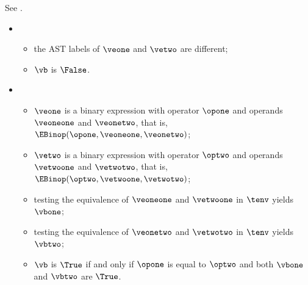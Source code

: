 
See .

\ProseParagraph
\OneApplies
\begin{itemize}
  \item {}
  \begin{itemize}
    \item the AST labels of $\veone$ and $\vetwo$ are different;
    \item $\vb$ is $\False$.
  \end{itemize}

  \item {}
  \begin{itemize}
    \item $\veone$ is a binary expression with operator $\opone$ and operands $\veoneone$ and $\veonetwo$,
          that is, $\EBinop(\opone, \veoneone, \veonetwo)$;
    \item $\vetwo$ is a binary expression with operator $\optwo$ and operands $\vetwoone$ and $\vetwotwo$,
          that is, $\EBinop(\optwo, \vetwoone, \vetwotwo)$;
    \item testing the equivalence of $\veoneone$ and $\vetwoone$ in $\tenv$ yields $\vbone$\ProseOrTypeError;
    \item testing the equivalence of $\veonetwo$ and $\vetwotwo$ in $\tenv$ yields $\vbtwo$\ProseOrTypeError;
    \item $\vb$ is $\True$ if and only if $\opone$ is equal to $\optwo$ and both $\vbone$ and $\vbtwo$ are $\True$.
  \end{itemize}


\end{itemize}
